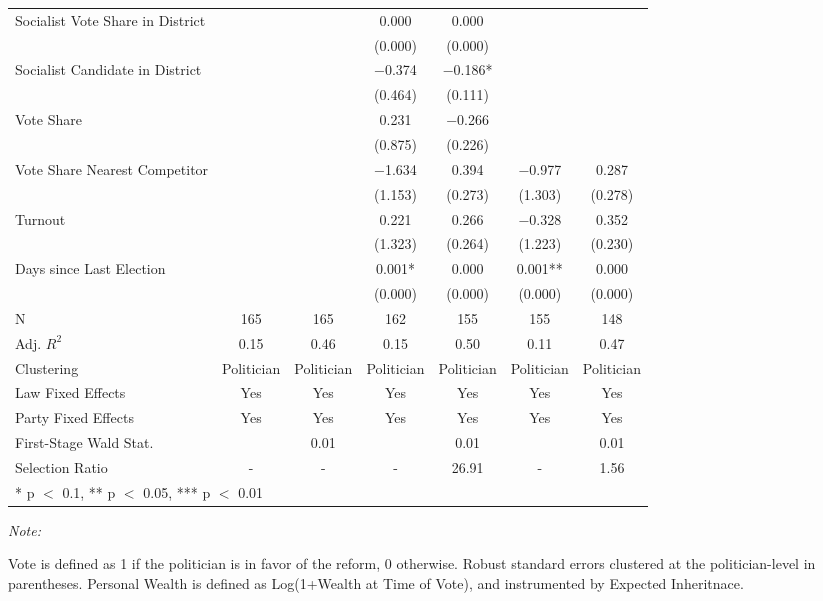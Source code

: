 \begin{table}[!h]
{\begin{threeparttable}
\begin{tabular}[t]{lcccccc}
Socialist Vote Share in District &  &  & \num{0.000} & \num{0.000} &  & \\
 &  &  & (\num{0.000}) & (\num{0.000}) &  & \\
Socialist Candidate in District &  &  & \num{-0.374} & \num{-0.186}* &  & \\
 &  &  & (\num{0.464}) & (\num{0.111}) &  & \\
Vote Share &  &  & \num{0.231} & \num{-0.266} &  & \\
 &  &  & (\num{0.875}) & (\num{0.226}) &  & \\
Vote Share Nearest Competitor &  &  & \num{-1.634} & \num{0.394} & \num{-0.977} & \num{0.287}\\
 &  &  & (\num{1.153}) & (\num{0.273}) & (\num{1.303}) & (\num{0.278})\\
Turnout &  &  & \num{0.221} & \num{0.266} & \num{-0.328} & \num{0.352}\\
 &  &  & (\num{1.323}) & (\num{0.264}) & (\num{1.223}) & (\num{0.230})\\
Days since Last Election &  &  & \num{0.001}* & \num{0.000} & \num{0.001}** & \num{0.000}\\
 &  &  & (\num{0.000}) & (\num{0.000}) & (\num{0.000}) & (\num{0.000})\\
\midrule
N & \num{165} & \num{165} & \num{162} & \num{155} & \num{155} & \num{148}\\
Adj. $R^2$ & \num{0.15} & \num{0.46} & \num{0.15} & \num{0.50} & \num{0.11} & \num{0.47}\\
Clustering & Politician & Politician & Politician & Politician & Politician & Politician\\
Law Fixed Effects & Yes & Yes & Yes & Yes & Yes & Yes\\
Party Fixed Effects & Yes & Yes & Yes & Yes & Yes & Yes\\
First-Stage Wald Stat. &  & 0.01 &  & 0.01 &  & 0.01\\
Selection Ratio & - & - & - & 26.91 & - & 1.56\\
\bottomrule
\multicolumn{7}{l}{\rule{0pt}{1em}* p $<$ 0.1, ** p $<$ 0.05, *** p $<$ 0.01}\\
\end{tabular}
\begin{tablenotes}[para]
\item \textit{Note: } 
\item Vote is defined as 1 if the politician is in favor of the reform, 0 otherwise. Robust standard errors clustered at the politician-level in parentheses. Personal Wealth is defined as Log(1+Wealth at Time of Vote), and instrumented by Expected Inheritnace.
\end{tablenotes}
\end{threeparttable}}
\end{table}
